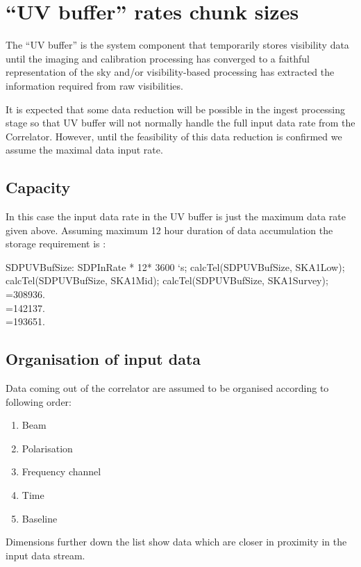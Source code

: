 \documentclass[useAMS,usenatbib,referee]{article}
\begin{document}
\section{``UV buffer'' rates chunk sizes}

The ``UV buffer'' is the system component that temporarily stores
visibility data until the imaging and calibration processing has
converged to a faithful representation of the sky and/or
visibility-based processing has extracted the information required
from raw visibilities. 

It is expected that some data reduction will be possible in the ingest
processing stage so that UV buffer will not normally handle the full
input data rate from the Correlator. However, until the feasibility of
this data reduction is confirmed we assume the maximal data input
rate. 

\subsection{Capacity}

In this case the input data rate in the UV buffer is just the maximum
data rate given above. Assuming maximum 12 hour duration of data
accumulation the storage requirement is :
\begin{maxima}[]
SDPUVBufSize: SDPInRate * 12* 3600 `s;
calcTel(SDPUVBufSize, SKA1Low);
calcTel(SDPUVBufSize, SKA1Mid);
calcTel(SDPUVBufSize, SKA1Survey);
\maximaoutput*
{}\;\, \\
\m  {}=308936.\; \\
\m  {}=142137.\; \\
\m  {}=193651.\; \\
\end{maxima}

\subsection{Organisation of input data}

Data coming out of the correlator are assumed to be organised
according to following order:
\begin{enumerate}
  \item Beam
  \item Polarisation
  \item Frequency channel
  \item Time 
  \item Baseline
\end{enumerate}
Dimensions further down the list show data which are closer in
proximity in the input data stream. 
\end{document}
